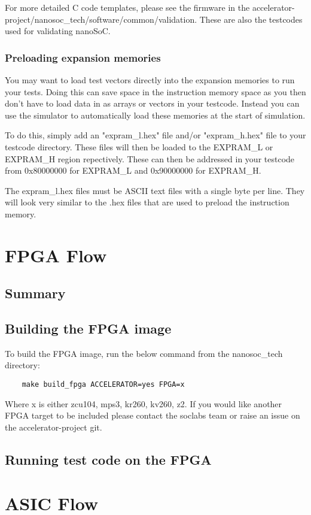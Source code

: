 \documentclass{report}
\begin{document}
For more detailed C code templates, please see the firmware in the 
accelerator-project/nanosoc\_tech/software/common/validation.
These are also the testcodes used for validating nanoSoC.

\subsection{Preloading expansion memories}
You may want to load test vectors directly into the expansion memories to run your tests. Doing this can save space in the 
instruction memory space as you then don't have to load data in as arrays or vectors in your testcode. Instead you can use the simulator
to automatically load these memories at the start of simulation.

To do this, simply add an "expram\_l.hex" file and/or "expram\_h.hex" file to your testcode directory. These files will then 
be loaded to the EXPRAM\_L or EXPRAM\_H region repectively. These can then be addressed in your testcode from 0x80000000 for EXPRAM\_L 
and 0x90000000 for EXPRAM\_H. 

The expram\_l.hex files must be ASCII text files with a single byte per line. They will look very similar to the .hex files that are used
to preload the instruction memory.


\chapter{FPGA Flow}
\section{Summary}

\section{Building the FPGA image}
To build the FPGA image, run the below command from the nanosoc\_tech directory:
\begin{lstlisting}
    make build_fpga ACCELERATOR=yes FPGA=x
\end{lstlisting}

Where x is either zcu104, mps3, kr260, kv260, z2. If you would like another FPGA target to be included
please contact the soclabs team or raise an issue on the accelerator-project git.

\section{Running test code on the FPGA}


\chapter{ASIC Flow}
\end{document}

